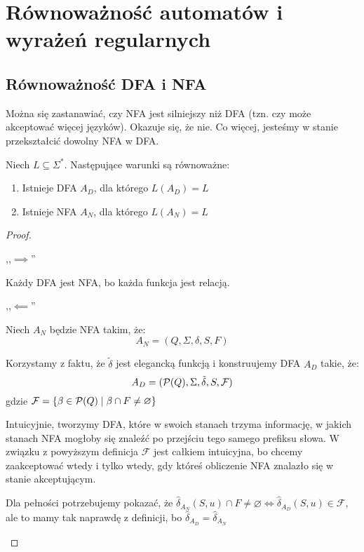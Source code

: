 \section{Równoważność automatów i wyrażeń regularnych}

\subsection{Równoważność DFA i NFA}

Można się zastanawiać, czy NFA jest silniejszy niż DFA (tzn. czy może akceptować więcej języków).
Okazuje się, że nie. Co więcej, jesteśmy w stanie przekształcić dowolny NFA w DFA.
\begin{theorem}
	Niech \( L \subseteq \Sigma^* \).
	Następujące warunki są równoważne:
	\begin{enumerate}
		\item Istnieje DFA \( A_D \), dla którego \( L(A_D) = L \)
		\item Istnieje NFA \( A_N \), dla którego \( L(A_N) = L \)
	\end{enumerate}
\end{theorem}
\begin{proof}
	\begin{description}
		\item ,,\( \implies \)''

		      Każdy DFA jest NFA, bo każda funkcja jest relacją.

		\item ,,\( \impliedby \)''

		      Niech \(A_N\) będzie NFA takim, że:
		      \[ A_N = (Q, \Sigma, \delta, S, F) \]

		      Korzystamy z faktu, że \( \tilde \delta \) jest elegancką funkcją i konstruujemy DFA \(A_D\) takie, że:
		      \[ A_D = (\operatorname{\mathcal{P}}(Q), \Sigma, \tilde \delta, S, \mathcal{F}) \]
		      gdzie \( \mathcal{F} = \set{\beta \in \powerset(Q) \mid \beta \cap F \neq \varnothing} \)

		      Intuicyjnie, tworzymy DFA, które w swoich stanach trzyma informację, w jakich stanach NFA mogłoby się znaleźć po przejściu tego samego prefiksu słowa. W związku z powyższym definicja \( \mathcal{F} \) jest całkiem intuicyjna, bo chcemy zaakceptować wtedy i tylko wtedy, gdy któreś obliczenie NFA znalazło się w stanie akceptującym.

		      Dla pełności potrzebujemy pokazać, że \( \hat \delta_{A_N}(S, u) \cap F \neq \varnothing \iff \hat \delta_{A_D}(S, u) \in \mathcal{F} \),
		      ale to mamy tak naprawdę z definicji, bo \( \hat \delta_{A_D} = \hat \delta_{A_N} \)
	\end{description}
\end{proof}

